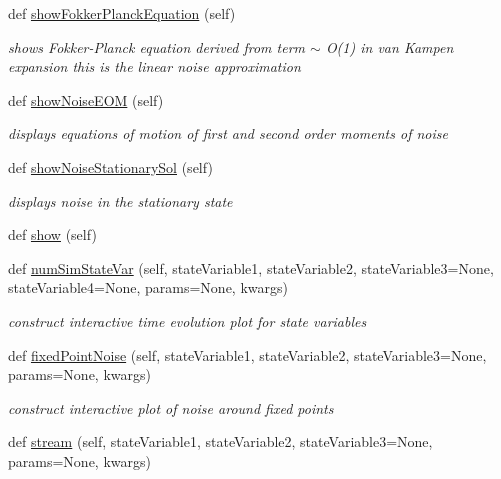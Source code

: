 \begin{DoxyCompactItemize}
def \hyperlink{class_mu_mo_t_1_1_mu_mo_t_1_1_mu_mo_tmodel_a999055f8c8e7e3107eb127e2a3122100}{show\+Fokker\+Planck\+Equation} (self)
\begin{DoxyCompactList}\small\item\em shows Fokker-\/\+Planck equation derived from term $\sim$ O(1) in van Kampen expansion this is the linear noise approximation \end{DoxyCompactList}\item 
def \hyperlink{class_mu_mo_t_1_1_mu_mo_t_1_1_mu_mo_tmodel_a44e2cab71795814aac670b94182ff064}{show\+Noise\+E\+OM} (self)
\begin{DoxyCompactList}\small\item\em displays equations of motion of first and second order moments of noise \end{DoxyCompactList}\item 
def \hyperlink{class_mu_mo_t_1_1_mu_mo_t_1_1_mu_mo_tmodel_a13c400d0d33921d51d4b27e7a52e3ee0}{show\+Noise\+Stationary\+Sol} (self)
\begin{DoxyCompactList}\small\item\em displays noise in the stationary state \end{DoxyCompactList}\item 
def \hyperlink{class_mu_mo_t_1_1_mu_mo_t_1_1_mu_mo_tmodel_ab4f4398c3f210fe4ea6e720401357691}{show} (self)
\item 
def \hyperlink{class_mu_mo_t_1_1_mu_mo_t_1_1_mu_mo_tmodel_af5417dafe51757b27a49c6b15aa5e090}{num\+Sim\+State\+Var} (self, state\+Variable1, state\+Variable2, state\+Variable3=None, state\+Variable4=None, params=None, kwargs)
\begin{DoxyCompactList}\small\item\em construct interactive time evolution plot for state variables \end{DoxyCompactList}\item 
def \hyperlink{class_mu_mo_t_1_1_mu_mo_t_1_1_mu_mo_tmodel_a3b78626249eb78091d9aad58f4a588aa}{fixed\+Point\+Noise} (self, state\+Variable1, state\+Variable2, state\+Variable3=None, params=None, kwargs)
\begin{DoxyCompactList}\small\item\em construct interactive plot of noise around fixed points \end{DoxyCompactList}\item 
def \hyperlink{class_mu_mo_t_1_1_mu_mo_t_1_1_mu_mo_tmodel_aaf3b4e03fc25612260987fe724e52f72}{stream} (self, state\+Variable1, state\+Variable2, state\+Variable3=None, params=None, kwargs)

\end{DoxyCompactItemize}
